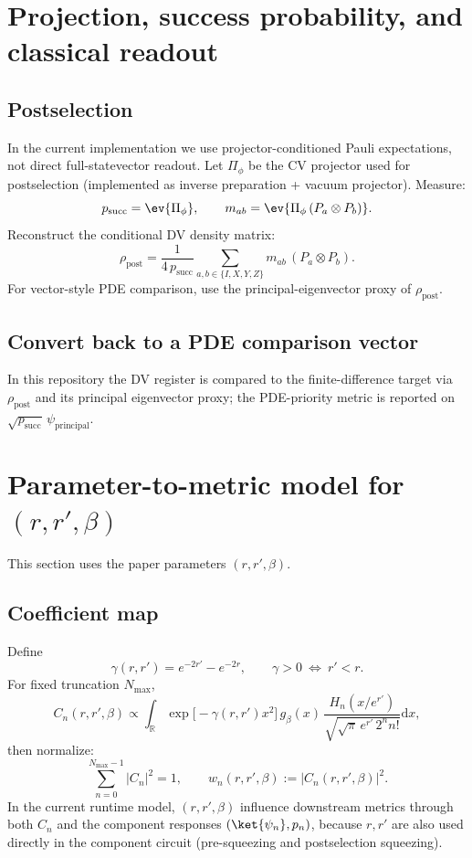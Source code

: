 \documentclass[11pt]{article}
\newcommand{\dd}{\mathrm{d}}
\newcommand{\RR}{\mathbb{R}}
\newcommand{\abs}[1]{\left\lvert #1 \right\rvert}
\begin{document}
\section{Projection, success probability, and classical readout}
\label{sec:projection}

\subsection{Postselection}
In the current implementation we use projector-conditioned Pauli expectations, not direct full-statevector readout.
Let $\Pi_\phi$ be the CV projector used for postselection (implemented as inverse preparation + vacuum projector).
Measure:
\[
p_{\mathrm{succ}} = \ev{\Pi_\phi},
\qquad
m_{ab}=\ev{\Pi_\phi\,(P_a\otimes P_b)}.
\]
Reconstruct the conditional DV density matrix:
\[
\rho_{\mathrm{post}}=\frac{1}{4\,p_{\mathrm{succ}}}\sum_{a,b\in\{I,X,Y,Z\}} m_{ab}\,(P_a\otimes P_b).
\]
For vector-style PDE comparison, use the principal-eigenvector proxy of \(\rho_{\mathrm{post}}\).

\subsection{Convert back to a PDE comparison vector}
In this repository the DV register is compared to the finite-difference target via
\(\rho_{\mathrm{post}}\) and its principal eigenvector proxy; the PDE-priority metric is reported on
\(\sqrt{p_{\mathrm{succ}}}\,\psi_{\mathrm{principal}}\).

\section{Parameter-to-metric model for \texorpdfstring{$(r,r',\beta)$}{(r,r',beta)}}
\label{sec:param_model}

This section uses the paper parameters \((r,r',\beta)\).

\subsection{Coefficient map}
Define
\[
\gamma(r,r')=e^{-2r'}-e^{-2r},\qquad \gamma>0\ \Leftrightarrow\ r'<r.
\]
For fixed truncation \(N_{\max}\),
\[
C_n(r,r',\beta)\propto
\int_{\RR}
\exp\!\big[-\gamma(r,r')x^2\big]\,
g_\beta(x)\,
\frac{H_n(x/e^{r'})}{\sqrt{\sqrt{\pi}\,e^{r'}\,2^n n!}}\dd x,
\]
then normalize:
\[
\sum_{n=0}^{N_{\max}-1}\abs{C_n}^2=1,\qquad
w_n(r,r',\beta):=\abs{C_n(r,r',\beta)}^2.
\]
In the current runtime model, \((r,r',\beta)\) influence downstream metrics through both \(C_n\) and the
component responses \((\ket{\psi_n},p_n)\), because \(r,r'\) are also used directly in the component circuit
(pre-squeezing and postselection squeezing).
\end{document}
